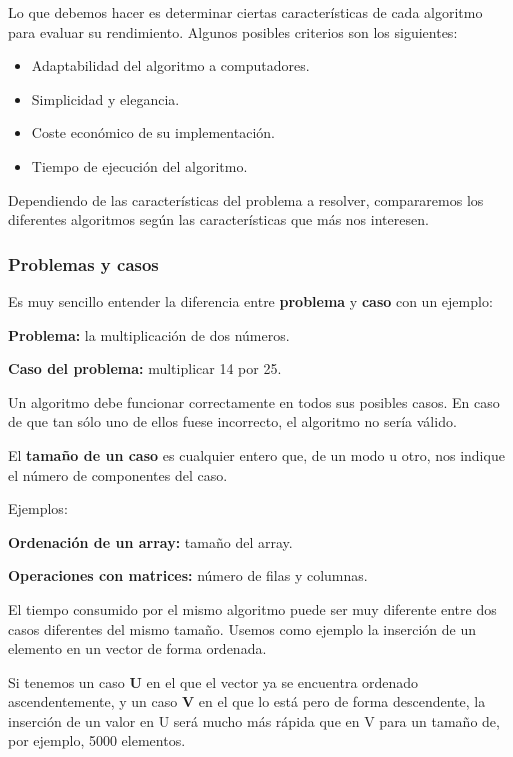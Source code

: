 \documentclass[11pt,a4paper]{article}
\begin{document}
Lo que debemos hacer es determinar ciertas características de cada algoritmo  para evaluar su rendimiento. Algunos posibles criterios son los siguientes:

\begin{itemize}
\item Adaptabilidad del algoritmo a computadores.
\item Simplicidad y elegancia.
\item Coste económico de su implementación.
\item Tiempo de ejecución del algoritmo.
\end{itemize}

Dependiendo de las características del problema a resolver, compararemos los diferentes algoritmos según las características que más nos interesen.

\subsubsection{Problemas y casos}

Es muy sencillo entender la diferencia entre \textbf{problema} y \textbf{caso} con un ejemplo:

\medskip

\textbf{Problema:} la multiplicación de dos números.

\textbf{Caso del problema:} multiplicar 14 por 25. 

\medskip

Un algoritmo debe funcionar correctamente en todos sus posibles casos. En caso de que tan sólo uno de ellos fuese incorrecto, el algoritmo no sería válido.

\medskip

El \textbf{tamaño de un caso} es cualquier entero que, de un modo u otro, nos indique el número de componentes del caso. 

\medskip

Ejemplos:

\textbf{Ordenación de un array:} tamaño del array.

\textbf{Operaciones con matrices:} número de filas y columnas.

\bigskip

El tiempo consumido por el mismo algoritmo puede ser muy diferente entre dos casos diferentes del mismo tamaño. Usemos como ejemplo la inserción de un elemento en un vector de forma ordenada. 

\medskip

Si tenemos un caso \textbf{U} en el que el vector ya se encuentra ordenado ascendentemente, y un caso \textbf{V} en el que lo está pero de forma descendente, la inserción de un valor en U será mucho más rápida que en V para un tamaño de, por ejemplo, 5000 elementos. 
\end{document}
